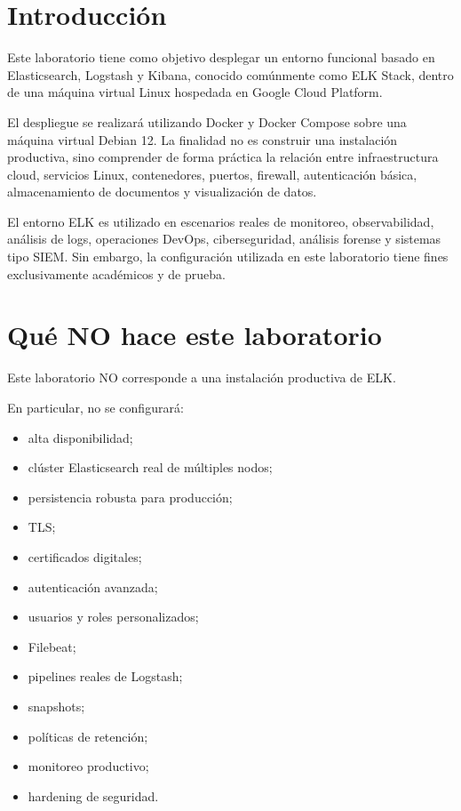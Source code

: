 \documentclass[
  coursetitle={Cómputo Nube y Tecnologías Emergentes},
  coursehours={96},
  coursedate={Verano 2026},
  doctype={Práctica},
  otherlangs={english,french},
  authorname={Lázaro},
  authorsurname={Bustio-Martínez},
  authortitle={PhD},
  role={Profesor Investigador},
  email={lbustio@inaoe.mx},
  phone={5559504000},
  ext={7459},
  institution={Instituto Nacional de Astrofísica, Óptica y Electrónica (INAOE)},
  department={Maestría en Ciencias en Tecnologías de Seguridad},
  address={Luis Enrique Erro 1, Sta. Ma. Tonantzintla, San Andrés Cholula, CP 72840, Puebla, México},
  margin={0.5in}
]{../../lbustio_lecture_notes}
\begin{document}
\IberoCover

\section{Introducción}

Este laboratorio tiene como objetivo desplegar un entorno funcional basado en Elasticsearch, Logstash y Kibana, conocido comúnmente como ELK Stack, dentro de una máquina virtual Linux hospedada en Google Cloud Platform.

El despliegue se realizará utilizando Docker y Docker Compose sobre una máquina virtual Debian 12. La finalidad no es construir una instalación productiva, sino comprender de forma práctica la relación entre infraestructura cloud, servicios Linux, contenedores, puertos, firewall, autenticación básica, almacenamiento de documentos y visualización de datos.

El entorno ELK es utilizado en escenarios reales de monitoreo, observabilidad, análisis de logs, operaciones DevOps, ciberseguridad, análisis forense y sistemas tipo SIEM. Sin embargo, la configuración utilizada en este laboratorio tiene fines exclusivamente académicos y de prueba.

\section{Qué NO hace este laboratorio}

Este laboratorio NO corresponde a una instalación productiva de ELK.

En particular, no se configurará:

\begin{itemize}
    \item alta disponibilidad;
    \item clúster Elasticsearch real de múltiples nodos;
    \item persistencia robusta para producción;
    \item TLS;
    \item certificados digitales;
    \item autenticación avanzada;
    \item usuarios y roles personalizados;
    \item Filebeat;
    \item pipelines reales de Logstash;
    \item snapshots;
    \item políticas de retención;
    \item monitoreo productivo;
    \item hardening de seguridad.
\end{itemize}
\end{document}
